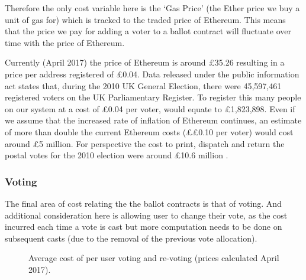 \documentclass{article}
\begin{document}
	Therefore the only cost variable here is the `Gas Price' (the Ether price we buy a unit of gas for) which is tracked to the traded price of Ethereum. This means that the price we pay for adding a voter to a ballot contract will fluctuate over time with the price of Ethereum.

	Currently (April 2017) the price of Ethereum is around \pounds35.26 resulting in a price per address registered of \pounds0.04. Data released under the public information act \citep{69_statistics_from_2010_election} states that, during the 2010 UK General Election, there were 45,597,461 registered voters on the UK Parliamentary Register. To register this many people on our system at a cost of \pounds0.04 per voter, would equate to \pounds1,823,898. Even if we assume that the increased rate of inflation of Ethereum continues, an estimate of more than double the current Ethereum costs (\pounds £0.10 per voter) would cost around \pounds5 million. For perspective the cost to print, dispatch and return the postal votes for the 2010 election were around \pounds10.6 million \citep{70_what_price_democracy_counting_the_cost_of_uk_elections}.
	
	\subsubsection{Voting}
	The final area of cost relating the the ballot contracts is that of voting. And additional consideration here is allowing user to change their vote, as the cost incurred each time a vote is cast but more computation needs to be done on subsequent casts (due to the removal of the previous vote allocation).
	
	
	\begin{figure}[h]
	\noindent  	
	\caption{Average cost of per user voting and re-voting (prices calculated April 2017).}
	\end{figure}
\end{document}
